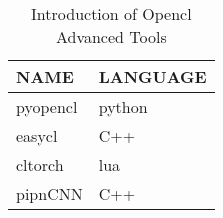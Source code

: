 \begin{table}[H]
\centering
\begin{tabular}{ll}
\toprule
  NAME&	LANGUAGE\\
\midrule
  pyopencl&	python\\
  easycl& C++\\
  cltorch& lua \\
  pipnCNN& C++\\
\bottomrule
\end{tabular}
\caption{Introduction of Opencl Advanced Tools}
\label{tbl:compare-opencl-tools}
\end{table}
